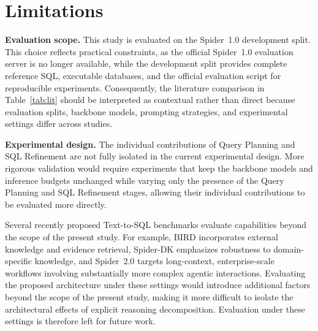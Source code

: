 \documentclass{svproc}
\begin{document}
\section{Limitations}
\label{sec:limits}

\textbf{Evaluation scope.}
This study is evaluated on the Spider~1.0 development split. This choice reflects practical constraints, as the official Spider~1.0 evaluation server is no longer available, while the development split provides complete reference SQL, executable databases, and the official evaluation script for reproducible experiments. Consequently, the literature comparison in Table~\ref{tab:lit} should be interpreted as contextual rather than direct because evaluation splits, backbone models, prompting strategies, and experimental settings differ across studies.


\textbf{Experimental design.}
The individual contributions of Query Planning and SQL Refinement are not fully isolated in the current experimental design. More rigorous validation would require experiments that keep the backbone models and inference budgets unchanged while varying only the presence of the Query Planning and SQL Refinement stages, allowing their individual contributions to be evaluated more directly.

Several recently proposed Text-to-SQL benchmarks evaluate capabilities beyond the scope of the present study. For example, BIRD incorporates external knowledge and evidence retrieval, Spider-DK emphasizes robustness to domain-specific knowledge, and Spider~2.0 targets long-context, enterprise-scale workflows involving substantially more complex agentic interactions. Evaluating the proposed architecture under these settings would introduce additional factors beyond the scope of the present study, making it more difficult to isolate the architectural effects of explicit reasoning decomposition. Evaluation under these settings is therefore left for future work.



\end{document}
